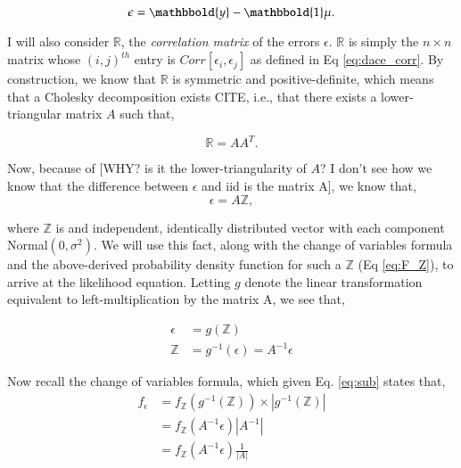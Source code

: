 \begin{equation}\label{eq:epsilon}
\epsilon = \mathbbold{y} - \mathbbold{1}\mu.
\end{equation}

I will also consider $\mathbb{R}$, the \emph{correlation matrix} of the errors $\epsilon$. $\mathbb{R}$ is simply the $n\times n$ matrix whose $(i,j)^{th}$ entry is $Corr[\epsilon_i,\epsilon_j]$ as defined in Eq \ref{eq:dace_corr}. By construction, we know that $\mathbb{R}$ is symmetric and positive-definite, which means that a Cholesky decomposition exists CITE\cite{linear_algebra}, i.e., that there exists a lower-triangular matrix $A$ such that,

\begin{equation} \label{eq:cholesky}
\mathbb{R} = A A^T.
\end{equation}

Now, because of [WHY? is it the lower-triangularity of $A$? I don't see how we know that the difference between $\epsilon$ and iid is the matrix A], we know that,
\begin{equation} \label{Y_sub}
\epsilon=A\mathbb{Z},
\end{equation}

where $\mathbb{Z}$ is and independent, identically distributed vector with each component Normal$(0,\sigma^2)$. We will use this fact, along with the change of variables formula and the above-derived probability density function for such a $\mathbb{Z}$ (Eq \ref{eq:F_Z}), to arrive at the likelihood equation. Letting $g$ denote the linear transformation equivalent to left-multiplication by the matrix A, we see that,

\begin{align}
\epsilon &= g(\mathbb{Z}) \nonumber \\
\mathbb{Z} &= g^{-1}(\epsilon) = A^{-1}\epsilon
\label{eq:sub}
\end{align}



Now recall the change of variables formula, which given Eq. \ref{eq:sub} states that,
\begin{align} \label{eq:change_of_vars}
f_\epsilon &= f_\mathbb{Z}\left (g^{-1}(\mathbb{Z})\right)\times \left | g^{-1}(\mathbb{Z}) \right | \\
			 &= f_\mathbb{Z}\left (A^{-1}\epsilon\right) |A^{-1}| \\ 
			 &= f_\mathbb{Z}\left (A^{-1}\epsilon\right) \frac{1}{|A|}
\end{align}

